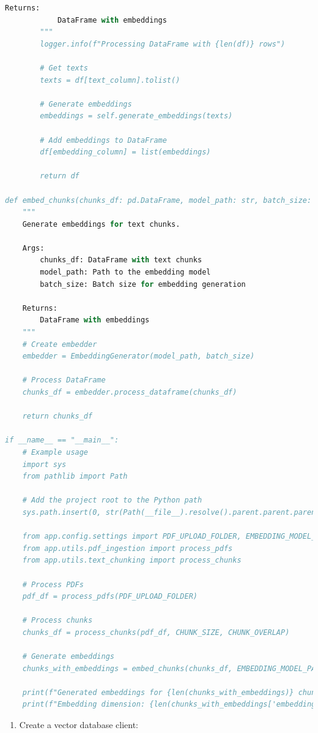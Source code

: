 \documentclass[
  screen,review,acmlarge]{acmart}
\providecommand{\tightlist}{%
  \setlength{\itemsep}{0pt}\setlength{\parskip}{0pt}}
\begin{document}
\begin{lstlisting}[language=Python]
        Returns:
            DataFrame with embeddings
        """
        logger.info(f"Processing DataFrame with {len(df)} rows")
        
        # Get texts
        texts = df[text_column].tolist()
        
        # Generate embeddings
        embeddings = self.generate_embeddings(texts)
        
        # Add embeddings to DataFrame
        df[embedding_column] = list(embeddings)
        
        return df

def embed_chunks(chunks_df: pd.DataFrame, model_path: str, batch_size: int = 32) -> pd.DataFrame:
    """
    Generate embeddings for text chunks.
    
    Args:
        chunks_df: DataFrame with text chunks
        model_path: Path to the embedding model
        batch_size: Batch size for embedding generation
        
    Returns:
        DataFrame with embeddings
    """
    # Create embedder
    embedder = EmbeddingGenerator(model_path, batch_size)
    
    # Process DataFrame
    chunks_df = embedder.process_dataframe(chunks_df)
    
    return chunks_df

if __name__ == "__main__":
    # Example usage
    import sys
    from pathlib import Path
    
    # Add the project root to the Python path
    sys.path.insert(0, str(Path(__file__).resolve().parent.parent.parent))
    
    from app.config.settings import PDF_UPLOAD_FOLDER, EMBEDDING_MODEL_PATH, CHUNK_SIZE, CHUNK_OVERLAP
    from app.utils.pdf_ingestion import process_pdfs
    from app.utils.text_chunking import process_chunks
    
    # Process PDFs
    pdf_df = process_pdfs(PDF_UPLOAD_FOLDER)
    
    # Process chunks
    chunks_df = process_chunks(pdf_df, CHUNK_SIZE, CHUNK_OVERLAP)
    
    # Generate embeddings
    chunks_with_embeddings = embed_chunks(chunks_df, EMBEDDING_MODEL_PATH)
    
    print(f"Generated embeddings for {len(chunks_with_embeddings)} chunks")
    print(f"Embedding dimension: {len(chunks_with_embeddings['embedding'].iloc[0])}")
\end{lstlisting}

\begin{enumerate}
\def\labelenumi{\arabic{enumi}.}
\setcounter{enumi}{2}
\tightlist
\item
  Create a vector database client:
\end{enumerate}
\end{document}
